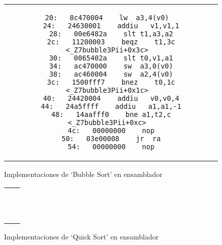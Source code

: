 \begin{figure}
\begin{center}
\begin{tabular}{c c}
\begin{minipage}[t]{.4\textwidth}
\begin{lstlisting}[language={[mips]Assembler},caption=bubble3, basicstyle=\ttfamily\tiny, tabsize=2]
  20:	8c470004 	lw	a3,4(v0)
  24:	24630001 	addiu	v1,v1,1
  28:	00e6482a 	slt	t1,a3,a2
  2c:	11200003 	beqz	t1,3c <_Z7bubble3Pii+0x3c>
  30:	0065402a 	slt	t0,v1,a1
  34:	ac470000 	sw	a3,0(v0)
  38:	ac460004 	sw	a2,4(v0)
  3c:	1500fff7 	bnez	t0,1c <_Z7bubble3Pii+0x1c>
  40:	24420004 	addiu	v0,v0,4
  44:	24a5ffff 	addiu	a1,a1,-1
  48:	14aafff0 	bne	a1,t2,c <_Z7bubble3Pii+0xc>
  4c:	00000000 	nop
  50:	03e00008 	jr	ra
  54:	00000000 	nop
		\end{lstlisting}
	\end{minipage} \\
\end{tabular}
\label{bubble}
\end{center}
\caption{Implementaciones de `Bubble Sort' en ensamblador}
\end{figure}

\begin{figure}
\begin{center}
\begin{tabular}{c c}
	\begin{minipage}[t]{.4\textwidth}
		\begin{lstlisting}[language={[mips]Assembler},caption=quick0,basicstyle=\ttfamily\tiny, tabsize=2]
		\end{lstlisting}
	\end{minipage} 
	&
	\begin{minipage}[t]{.4\textwidth}
		\begin{lstlisting}[language={[mips]Assembler},caption=quick1, basicstyle=\ttfamily\tiny, tabsize=2]
		\end{lstlisting}
		\begin{lstlisting}[language={[mips]Assembler},caption=quick2, basicstyle=\ttfamily\tiny, tabsize=2]
		\end{lstlisting}
		\begin{lstlisting}[language={[mips]Assembler},caption=quick3, basicstyle=\ttfamily\tiny, tabsize=2]
		\end{lstlisting}
	\end{minipage} \\
\end{tabular}
\label{quick}
\end{center}
\caption{Implementaciones de `Quick Sort' en ensamblador}
\end{figure}

